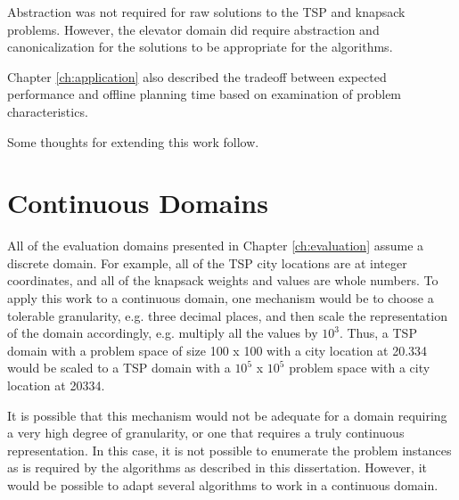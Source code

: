 Abstraction was not required for raw solutions to the TSP and knapsack problems.  However, the elevator domain did require abstraction and canonicalization for the solutions to be appropriate for the algorithms.

Chapter \ref{ch:application} also described the tradeoff between expected performance and offline planning time based on examination of problem characteristics.


Some thoughts for extending this work follow.

\section{Continuous Domains}

All of the evaluation domains presented in Chapter \ref{ch:evaluation} assume a discrete domain.  For example, all of the TSP city locations are at integer coordinates, and all of the knapsack weights and values are whole numbers.  To apply this work to a continuous domain, one mechanism would be to choose a tolerable granularity, e.g. three decimal places, and then scale the representation of the domain accordingly, e.g. multiply all the values by $10^3$.  Thus, a TSP domain with a problem space of size 100 x 100 with a city location at 20.334 would be scaled to a TSP domain with a $10^5$ x $10^5$ problem space with a city location at 20334.

It is possible that this mechanism would not be adequate for a domain requiring a very high degree of granularity, or one that requires a truly continuous representation.  In this case, it is not  possible to enumerate the problem instances as is required by the algorithms as described in this dissertation.  However, it would be possible to adapt several algorithms to work in a continuous domain.

